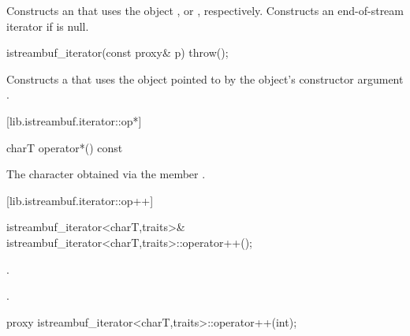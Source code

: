 \begin{itemdescr}
\pnum
\effects
Constructs an
that uses the
object
,
or
,
respectively.
Constructs an end-of-stream iterator if
is null.
\end{itemdescr}


%
\begin{itemdecl}
istreambuf_iterator(const proxy& p) throw();
\end{itemdecl}

\begin{itemdescr}
\pnum
\effects
Constructs a
that uses the
object pointed to by the
object's constructor argument .
\end{itemdescr}

[lib.istreambuf.iterator::op*]{}

%
\begin{itemdecl}
charT operator*() const
\end{itemdecl}

\begin{itemdescr}
\pnum
\returns
The character obtained via the
member
.
\end{itemdescr}

[lib.istreambuf.iterator::op++]{}

%
\begin{itemdecl}
istreambuf_iterator<charT,traits>&
    istreambuf_iterator<charT,traits>::operator++();
\end{itemdecl}

\begin{itemdescr}
\pnum
\effects
{}.

\pnum
\returns
{}.
\end{itemdescr}

%
%
\begin{itemdecl}
proxy istreambuf_iterator<charT,traits>::operator++(int);
\end{itemdecl}

